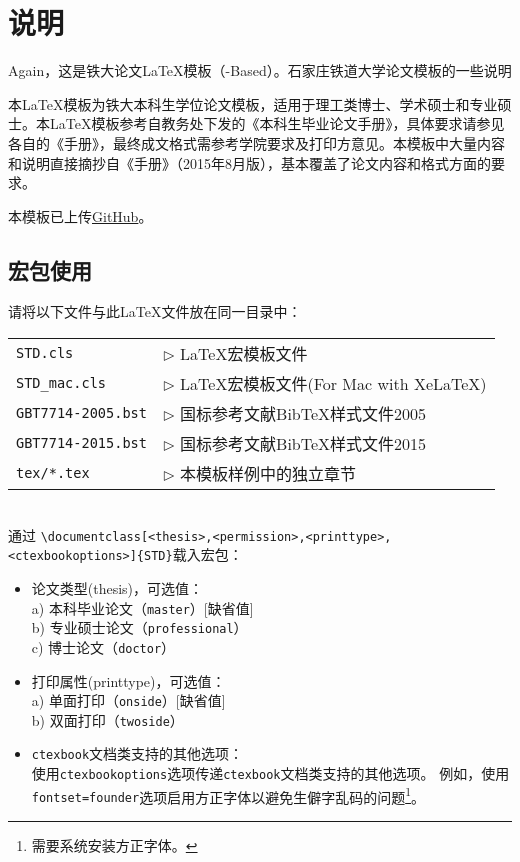 \chapter{说明}

Again，这是铁大论文\LaTeX{}模板（\CTeX{}-Based）\STDThesis{}。石家庄铁道大学论文模板的一些说明

本\LaTeX{}模板为铁大本科生学位论文模板，适用于理工类博士、学术硕士和专业硕士。本\LaTeX{}模板参考自教务处下发的《本科生毕业论文手册》，具体要求请参见各自的《手册》，最终成文格式需参考学院要求及打印方意见。本模板中大量内容和说明直接摘抄自《手册》（2015年8月版），基本覆盖了论文内容和格式方面的要求。

本模板已上传\href{https://github.com/dancvv/stdthesis}{GitHub}。
\section{宏包使用}

请将以下文件与此LaTeX文件放在同一目录中：

\begin{tabular}{ll}
 \verb|STD.cls |             & $\triangleright$ LaTeX宏模板文件 \\
 \verb|STD_mac.cls |         & $\triangleright$ LaTeX宏模板文件(For Mac with XeLaTeX) \\
 \verb|GBT7714-2005.bst|      & $\triangleright$ 国标参考文献BibTeX样式文件2005 \\
 \verb|GBT7714-2015.bst|      & $\triangleright$ 国标参考文献BibTeX样式文件2015 \\
 \verb|tex/*.tex|             & $\triangleright$ 本模板样例中的独立章节\\
\end{tabular}\\

通过 \verb|\documentclass[<thesis>,<permission>,<printtype>,<ctexbookoptions>]{STD}|载入宏包：
\begin{itemize}[leftmargin=3cm]
  \item[{\tt thesis} $\triangleright$]  论文类型(thesis)，可选值：\\
    a) 本科毕业论文（\verb|master|）[缺省值]\\
    b) 专业硕士论文（\verb|professional|）\\
    c) 博士论文（\verb|doctor|）
  \item[{\tt printtype} $\triangleright$] 打印属性(printtype)，可选值： \\
    a) 单面打印（\verb|onside|）[缺省值]\\
    b) 双面打印（\verb|twoside|）
  \item[{\tt ctexbookoptions} $\triangleright$] {\tt ctexbook}文档类支持的其他选项： \\
    使用{\tt ctexbookoptions}选项传递{\tt ctexbook}文档类支持的其他选项。
    例如，使用{\tt fontset=founder}选项启用方正字体以避免生僻字乱码的问题\footnote{需要系统安装方正字体。}。
\end{itemize}

